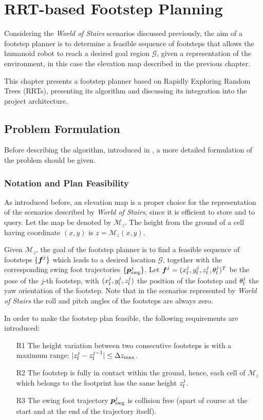 \chapter{RRT-based Footstep Planning}
\label{ch:rrt-based-footstep-planning}

Considering the \textit{World of Stairs} scenarios discussed previously, the 
aim of a footstep planner is to determine a feasible sequence of footsteps that 
allows the humanoid robot to reach a desired goal region $\mathcal{G}$, given 
a representation of the environment, in this case the elevation map described in 
the previous chapter.

This chapter presents a footstep planner based on Rapidly Exploring Random
Trees (RRTs), presenting its algorithm and discussing its integration into
the project architecture.

\section{Problem Formulation}
Before describing the algorithm, introduced in \cite{ECC19}, a more detailed 
formulation of the problem should be given.

\subsection{Notation and Plan Feasibility}
As introduced before, an 
elevation map is a proper choice for the representation of the scenarios 
described by \textit{World of Stairs}, since it is efficient to store and to 
query. Let the map be denoted by $\mathcal{M}_z$. The height from the ground of
a cell having coordinate $(x, y)$ is $z = \mathcal{M}_z(x, y)$.

Given $\mathcal{M}_z$, the goal of the footstep planner is to find 
a feasible sequence of footsteps $\{{\mbox{\boldmath $f$}}^j\}$ which leads to a desired location 
$\mathcal{G}$, together with the corresponding swing foot trajectories
$\{{\mbox{\boldmath $p$}}_{\rm {swg}}^j\}$. Let ${\mbox{\boldmath $f$}}^j = (x_{\rm f}^j, y_{\rm f}^j,
z_{\rm f}^j, \theta_{\rm f}^j)^T$ be the pose of the $j$-th footstep, 
with $(x_{\rm f}^j, y_{\rm f}^j, z_{\rm f}^j)$ the position of the footstep and 
$\theta_{\rm f}^j$ the yaw orientation of the footstep.
Note that in the scenarios 
represented by \textit{World of Stairs} the roll and pitch angles of the 
footsteps are always zero.

In order to make the footstep plan feasible, the following 
requirements are introduced:
\begin{itemize}
  \item[R1] The height variation between two consecutive footsteps is with 
      a maximum range: $|z_{\rm f}^j - z_{\rm f}^{j-1}| \le \Delta z_{\max}$.
  \item[R2] The footstep is fully in contact within the ground, hence,
      each cell of $\mathcal{M}_z$ which belongs to the footprint has the 
      same height $z_{\rm f}^j$.
  \item[R3] The swing foot trajectory ${\mbox{\boldmath $p$}}_{\rm {swg}}^j$ is collision free
      (apart of course at the start and at the end of the trajectory itself).
\end{itemize}


